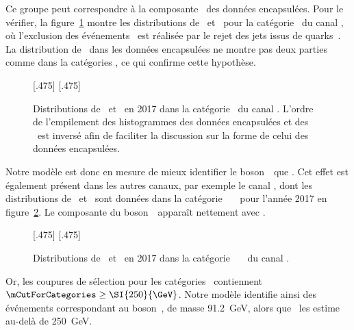 Ce groupe peut correspondre à la composante \ttbar\ des données encapsulées.
Pour le vérifier, la figure~\ref{fig-distributions_mml_mttot_2017_tt_nobtag}
montre les distributions de \mTtot\ et \mml\ pour la catégorie \CATnobtag\ du canal \tauh\tauh,
où l'exclusion des événements \ttbar\ est réalisée par le rejet des jets issus de quarks~\quarkb.
La distribution de \mml\ dans les données encapsulées ne montre pas deux parties comme dans la catégories \CATbtag,
ce qui confirme cette hypothèse.
\begin{figure}[h]
\centering

[.475\textwidth]
{}
\hfill
{}[.475\textwidth]
{}

\caption[Distributions de \mTtot\ et \mml\ en 2017 dans la catégorie \CATnobtag\ du canal \tauh\tauh.]{Distributions de \mTtot\ et \mml\ en 2017 dans la catégorie \CATnobtag\ du canal \tauh\tauh. L'ordre de l'empilement des histogrammes des données encapsulées et des \ftauhs\ est inversé afin de faciliter la discussion sur la forme de celui des données encapsulées.}
\label{fig-distributions_mml_mttot_2017_tt_nobtag}
\end{figure}
\par
Notre modèle est donc en mesure de mieux identifier le boson~\Zboson\ que \mTtot.
Cet effet est également présent dans les autres canaux, par exemple le canal \mu\tauh,
dont les distributions de \mTtot\ et \mml\ sont données dans la catégorie \CATbsm\ \CATnobtag\ \CATloosemt\ pour l'année 2017 en figure~\ref{fig-distributions_mml_mttot_2017_mt_BSM_nobtag_loosemt}.
Le composante du boson~\Zboson\ apparaît nettement avec \mml.
\begin{figure}[h]
\centering

[.475\textwidth]
{}
\hfill
{}[.475\textwidth]
{}

\caption[Distributions de \mTtot\ et \mml\ en 2017 dans la catégorie \CATbsm\ \CATnobtag\ \CATloosemt\ du canal \mu\tauh.]{Distributions de \mTtot\ et \mml\ en 2017 dans la catégorie \CATbsm\ \CATnobtag\ \CATloosemt\ du canal \mu\tauh.}
\label{fig-distributions_mml_mttot_2017_mt_BSM_nobtag_loosemt}
\end{figure}
\par
Or, les coupures de sélection pour les catégories \CATbsm\ contiennent
$\mCutForCategories \geq \SI{250}{\GeV}$.
Notre modèle identifie ainsi des événements correspondant au boson~\Zboson,
de masse \SI{91.2}{\GeV},
alors que \SVFIT\ les estime au-delà de \SI{250}{\GeV}.
